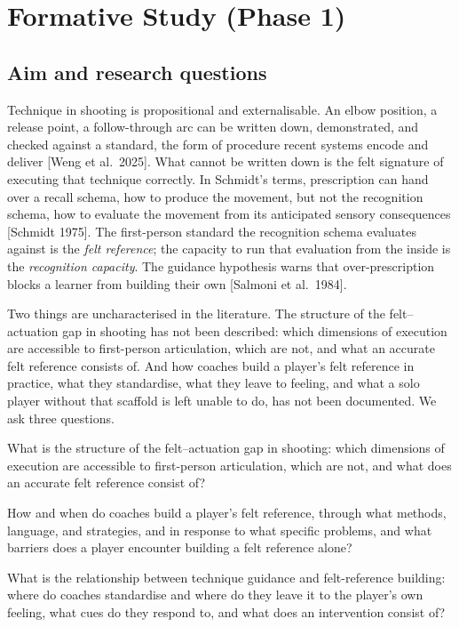 \documentclass[sigconf]{acmart}
\begin{document}
\section{Formative Study (Phase 1)}

\subsection{Aim and research questions}

Technique in shooting is propositional and externalisable. An elbow position, a release point, a follow-through arc can be written down, demonstrated, and checked against a standard, the form of procedure recent systems encode and deliver [Weng et al.\ 2025]. What cannot be written down is the felt signature of executing that technique correctly. In Schmidt's terms, prescription can hand over a recall schema, how to produce the movement, but not the recognition schema, how to evaluate the movement from its anticipated sensory consequences [Schmidt 1975]. The first-person standard the recognition schema evaluates against is the \emph{felt reference}; the capacity to run that evaluation from the inside is the \emph{recognition capacity}. The guidance hypothesis warns that over-prescription blocks a learner from building their own [Salmoni et al.\ 1984].

Two things are uncharacterised in the literature. The structure of the felt--actuation gap in shooting has not been described: which dimensions of execution are accessible to first-person articulation, which are not, and what an accurate felt reference consists of. And how coaches build a player's felt reference in practice, what they standardise, what they leave to feeling, and what a solo player without that scaffold is left unable to do, has not been documented. We ask three questions.

\begin{description}[leftmargin=1.2em]
  \item[F-RQ1.] What is the structure of the felt--actuation gap in shooting: which dimensions of execution are accessible to first-person articulation, which are not, and what does an accurate felt reference consist of?
  \item[F-RQ2.] How and when do coaches build a player's felt reference, through what methods, language, and strategies, and in response to what specific problems, and what barriers does a player encounter building a felt reference alone?
  \item[F-RQ3.] What is the relationship between technique guidance and felt-reference building: where do coaches standardise and where do they leave it to the player's own feeling, what cues do they respond to, and what does an intervention consist of?
\end{description}
\end{document}
